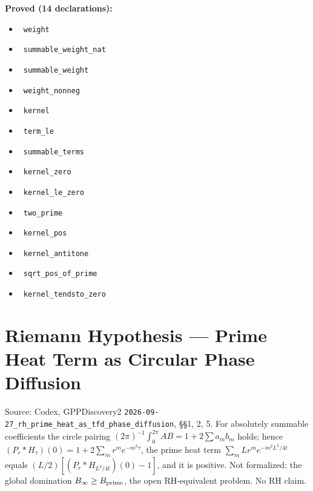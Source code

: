 \documentclass{report}
\theoremstyle{definition}
\begin{document}
\noindent\textbf{Proved (14 declarations):}
\begin{itemize}
  \item {}\leanok\ \texttt{weight}
  \item {}\leanok\ \texttt{summable\_weight\_nat}
  \item {}\leanok\ \texttt{summable\_weight}
  \item {}\leanok\ \texttt{weight\_nonneg}
  \item {}\leanok\ \texttt{kernel}
  \item {}\leanok\ \texttt{term\_le}
  \item {}\leanok\ \texttt{summable\_terms}
  \item {}\leanok\ \texttt{kernel\_zero}
  \item {}\leanok\ \texttt{kernel\_le\_zero}
  \item {}\leanok\ \texttt{two\_prime}
  \item {}\leanok\ \texttt{kernel\_pos}
  \item {}\leanok\ \texttt{kernel\_antitone}
  \item {}\leanok\ \texttt{sqrt\_pos\_of\_prime}
  \item {}\leanok\ \texttt{kernel\_tendsto\_zero}
\end{itemize}

\section{Riemann Hypothesis --- Prime Heat Term as Circular Phase Diffusion}
Source: Codex, GPPDiscovery2 \texttt{2026-09-27\_rh\_prime\_heat\_as\_tfd\_phase\_diffusion}, \S\S1, 2, 5. For absolutely summable coefficients the circle pairing $(2\pi)^{-1}\int_0^{2\pi}AB=1+2\sum a_mb_m$ holds; hence $(P_r*H_\tau)(0)=1+2\sum_m r^me^{-m^2\tau}$, the prime heat term $\sum_m L r^m e^{-m^2L^2/4t}$ equals $(L/2)[(P_r*H_{L^2/4t})(0)-1]$, and it is positive. Not formalized: the global domination $B_\infty\ge B_{\rm prime}$, the open RH-equivalent problem. No RH claim.
\end{document}
